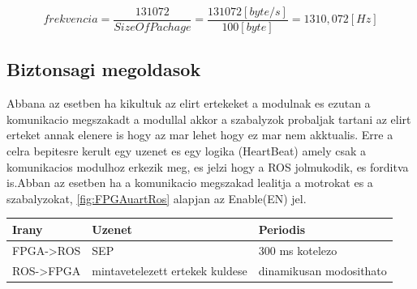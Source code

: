 \begin{equation}
    frekvencia = \frac{131072}{SizeOfPachage}=\frac{131072[byte/s]}{100[byte]}=1310,072 [Hz]
\end{equation}

\subsection{Biztonsagi megoldasok}

Abbana az esetben ha kikultuk az elirt ertekeket a modulnak es ezutan a komunikacio megszakadt a modullal akkor a szabalyzok probaljak tartani az elirt erteket annak elenere is hogy az mar lehet hogy ez mar nem akktualis. Erre a celra bepitesre kerult egy uzenet es egy logika (HeartBeat) amely csak a komunikacios modulhoz erkezik meg, es jelzi hogy a ROS jolmukodik, es forditva is.Abban az esetben ha a komunikacio megszakad lealitja a motrokat es a szabalyzokat,  \ref{fig:FPGAuartRos} alapjan az Enable(EN) jel.

\begin{table}[H]
\center
\begin{tabular}{lll}
\hline Irany   & Uzenet & Periodis    \\ \hline
FPGA->ROS &  SEP        & 300 ms kotelezo         \\
ROS->FPGA &  mintavetelezett ertekek kuldese & dinamikusan modosithato                   
\end{tabular}
\end{table}
















